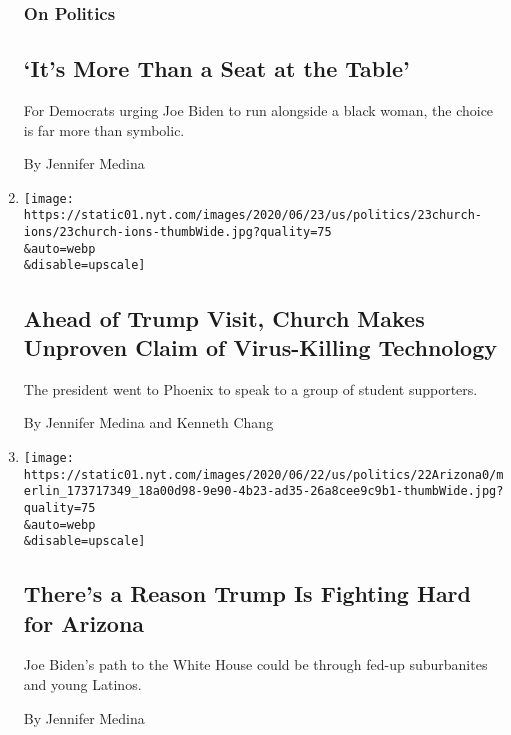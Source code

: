 \begin{enumerate}
  \hypertarget{on-politics}{%
  \subsubsection{On Politics}\label{on-politics}}

  \hypertarget{its-more-than-a-seat-at-the-table}{%
  \subsection{`It's More Than a Seat at the
  Table'}\label{its-more-than-a-seat-at-the-table}}

  For Democrats urging Joe Biden to run alongside a black woman, the
  choice is far more than symbolic.

  By Jennifer Medina
\item
  \href{/2020/06/23/us/politics/trump-arizona-church-covid.html}{}

  \texttt{[image: https://static01.nyt.com/images/2020/06/23/us/politics/23church-ions/23church-ions-thumbWide.jpg?quality=75\\\&auto=webp\\\&disable=upscale]}

  \hypertarget{ahead-of-trump-visit-church-makes-unproven-claim-of-virus-killing-technology}{%
  \subsection{Ahead of Trump Visit, Church Makes Unproven Claim of
  Virus-Killing
  Technology}\label{ahead-of-trump-visit-church-makes-unproven-claim-of-virus-killing-technology}}

  The president went to Phoenix to speak to a group of student
  supporters.

  By Jennifer Medina and Kenneth Chang
\item
  \href{/2020/06/23/us/politics/arizona-2020-election-democrats-republicans.html}{}

  \texttt{[image: https://static01.nyt.com/images/2020/06/22/us/politics/22Arizona0/merlin\_173717349\_18a00d98-9e90-4b23-ad35-26a8cee9c9b1-thumbWide.jpg?quality=75\\\&auto=webp\\\&disable=upscale]}

  \hypertarget{theres-a-reason-trump-is-fighting-hard-for-arizona}{%
  \subsection{There's a Reason Trump Is Fighting Hard for
  Arizona}\label{theres-a-reason-trump-is-fighting-hard-for-arizona}}

  Joe Biden's path to the White House could be through fed-up
  suburbanites and young Latinos.

  By Jennifer Medina
\end{enumerate}

